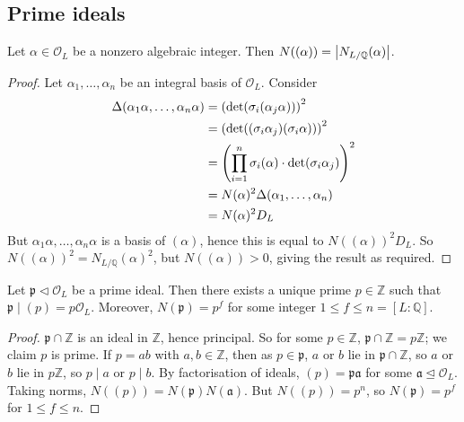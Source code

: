 \subsection{Prime ideals}
\begin{lemma}
    Let \( \alpha \in \mathcal O_L \) be a nonzero algebraic integer.
    Then \( N((\alpha)) = \abs{N_{L/\mathbb Q}(\alpha)} \).
\end{lemma}
\begin{proof}
    Let \( \alpha_1, \dots, \alpha_n \) be an integral basis of \( \mathcal O_L \).
    Consider
    \begin{align*}
        \Delta(\alpha_1\alpha, \dots, \alpha_n\alpha) &= \qty(\det(\sigma_i (\alpha_j \alpha)))^2 \\
        &= \qty(\det((\sigma_i \alpha_j)(\sigma_i \alpha)))^2 \\
        &= \qty(\prod_{i=1}^n \sigma_i(\alpha) \cdot \det (\sigma_i \alpha_j))^2 \\
        &= N(\alpha)^2 \Delta(\alpha_1, \dots, \alpha_n) \\
        &= N(\alpha)^2 D_L
    \end{align*}
    But \( \alpha_1\alpha, \dots, \alpha_n\alpha \) is a basis of \( (\alpha) \), hence this is equal to \( N((\alpha))^2 D_L \).
    So \( N((\alpha))^2 = N_{L/\mathbb Q}(\alpha)^2 \), but \( N((\alpha)) > 0 \), giving the result as required.
\end{proof}
\begin{lemma}
    Let \( \mathfrak p \triangleleft \mathcal O_L \) be a prime ideal.
    Then there exists a unique prime \( p \in \mathbb Z \) such that \( \mathfrak p \mid (p) = p\mathcal O_L \).
    Moreover, \( N(\mathfrak p) = p^f \) for some integer \( 1 \leq f \leq n = [L:\mathbb Q] \).
\end{lemma}
\begin{proof}
    \( \mathfrak p \cap \mathbb Z \) is an ideal in \( \mathbb Z \), hence principal.
    So for some \( p \in \mathbb Z \), \( \mathfrak p \cap \mathbb Z = p \mathbb Z \); we claim \( p \) is prime.
    If \( p = ab \) with \( a, b \in \mathbb Z \), then as \( p \in \mathfrak p \), \( a \) or \( b \) lie in \( \mathfrak p \cap \mathbb Z \), so \( a \) or \( b \) lie in \( p \mathbb Z \), so \( p \mid a \) or \( p \mid b \).
    By factorisation of ideals, \( (p) = \mathfrak p \mathfrak a \) for some \( \mathfrak a \trianglelefteq \mathcal O_L \).
    Taking norms, \( N((p)) = N(\mathfrak p) N(\mathfrak a) \).
    But \( N((p)) = p^n \), so \( N(\mathfrak p) = p^f \) for \( 1 \leq f \leq n \).
\end{proof}
